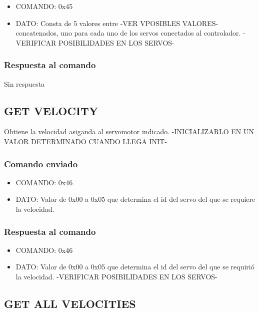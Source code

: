 \documentclass[a4paper,11pt]{article}
\begin{document}
\begin{itemize}
	\item{COMANDO:} 0x45
	\item{DATO:} Consta de 5 valores entre -VER VPOSIBLES VALORES- concatenados, uno para cada uno de los servos conectados al controlador.
	-VERIFICAR POSIBILIDADES EN LOS SERVOS-
\end{itemize}

\subsubsection*{Respuesta al comando}
\label{set_all_velocities_respuesta}

Sin respuesta

\subsection{GET VELOCITY}
\label{set_velocity}

Obtiene la velocidad asiganda al servomotor indicado. -INICIALIZARLO EN UN VALOR DETERMINADO CUANDO LLEGA INIT-

\subsubsection*{Comando enviado}
\label{set_velocity_comando_enviado}

\begin{itemize}
	\item{COMANDO:} 0x46
	\item{DATO:} Valor de 0x00 a 0x05 que determina el id del servo del que se requiere la velocidad.
\end{itemize}

\subsubsection*{Respuesta al comando}
\label{set_velocity_respuesta}

\begin{itemize}
	\item{COMANDO:} 0x46
	\item{DATO:} Valor de 0x00 a 0x05 que determina el id del servo del que se requiri\'o la velocidad.
	-VERIFICAR POSIBILIDADES EN LOS SERVOS-
\end{itemize}

\subsection{GET ALL VELOCITIES}
\label{get_all_velocities}
\end{document}
